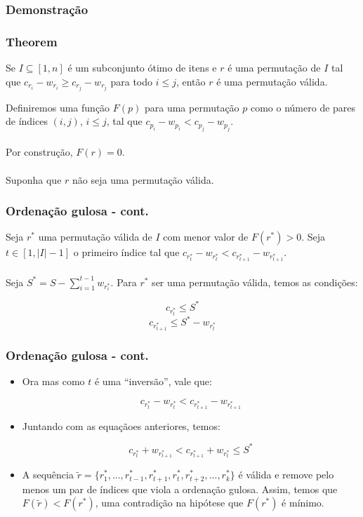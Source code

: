 \documentclass{beamer}
\begin{document}
\begin{frame}
\frametitle{Demonstração}
\frametitle{Theorem}
\begin{theorem}
Se $I \subseteq [1, n]$ é um subconjunto ótimo de itens e $r$ é uma permutação de $I$ tal que $c_{r_i} - w_{r_i} \geq c_{r_j} - w_{r_j}$ para todo $i \leq j$, então $r$ é uma permutação válida.
\end{theorem}
Definiremos uma função $F(p)$ para uma permutação $p$ como o número de pares de índices $(i, j)$, $i \leq j$, tal que $c_{p_i} - w_{p_i} < c_{p_j} - w_{p_j}$.\\~\\

Por construção, $F(r) = 0$. \\~\\

Suponha que $r$ não seja uma permutação válida.

\end{frame}


\begin{frame}
\frametitle{Ordenação gulosa - cont.}


Seja $r^*$ uma permutação válida de $I$ com menor valor de $F(r^*) > 0$. Seja $t \in [1, |I| - 1]$ o primeiro índice tal que $c_{r^*_t} - w_{r^*_t} < c_{r^*_{t + 1}} - w_{r^*_{t + 1}}$.\\~\\

Seja $S^* = S - \sum_{i = 1}^{t - 1} w_{r^*_i}$. Para $r^*$ ser uma permutação válida, temos as condições:

$$c_{r^*_t} \leq S^*$$
$$c_{r^*_{t + 1}} \leq S^* - w_{r^*_t}$$

\end{frame}


\begin{frame}
\frametitle{Ordenação gulosa - cont.}

\begin{itemize}
\item Ora mas como $t$ é uma ``inversão'', vale que:

$$c_{r^*_t} - w_{r^*_t} < c_{r^*_{t + 1}} - w_{r^*_{t + 1}}$$

\item Juntando com as equaçãoes anteriores, temos:

$$c_{r^*_{t}} + w_{r^*_{t + 1}} < c_{r^*_{t + 1}} + w_{r^*_t} \leq S^*$$

\item A sequência $\widetilde{r} = \{r^*_1, ..., r^*_{t - 1}, r^*_{t + 1}, r^*_t, r^*_{t + 2}, ..., r^*_k\}$ é válida e remove pelo menos um par de índices que viola a ordenação gulosa. Assim, temos que $F(\widetilde{r}) < F(r^*)$, uma contradição na hipótese que $F(r^*)$ é mínimo.
\end{itemize}

\end{frame}
\end{document}
